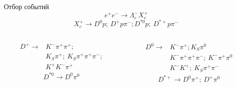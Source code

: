 \documentclass{beamer}
\begin{document}
\begin{frame}{Отбор событий}
    \begin{equation*}
        e^+ e^- \to \Lambda_c^- X_c^+
    \end{equation*}
    \begin{equation*}
        X_c^+ \to D^0 p ; \ D^+ p \pi^- ; D^{*0} p ; 
        \  D^{*+} p \pi^-
    \end{equation*}
    \begin{columns}
        \begin{column}{0.33\textwidth}
            \begin{align*}
                D^+ \to & K^- \pi^+ \pi^+; \\
                & K_S \pi^+; \ K_S \pi^+ \pi^+ \pi^-; \\
                & K^+ K^- \pi^+
            \end{align*}
            \begin{align*}
                D^{*0} \to D^0 \pi^0 
            \end{align*}
        \end{column}
        \begin{column}{0.33\textwidth}
            \begin{align*}
                D^0 \to & K^- \pi^+; K_S \pi^0 \\
                & K^- \pi^+ \pi^+ \pi^-; \ K^- \pi^+ \pi^0 \\
                & K^- K^+ ; \ K_S \pi^+ \pi^-
            \end{align*}
            \begin{align*}
                D^{*+} \to  D^0 \pi^+; \ D^+ \pi^0
            \end{align*}
        \end{column}
    \end{columns}
\end{frame}
\end{document}
